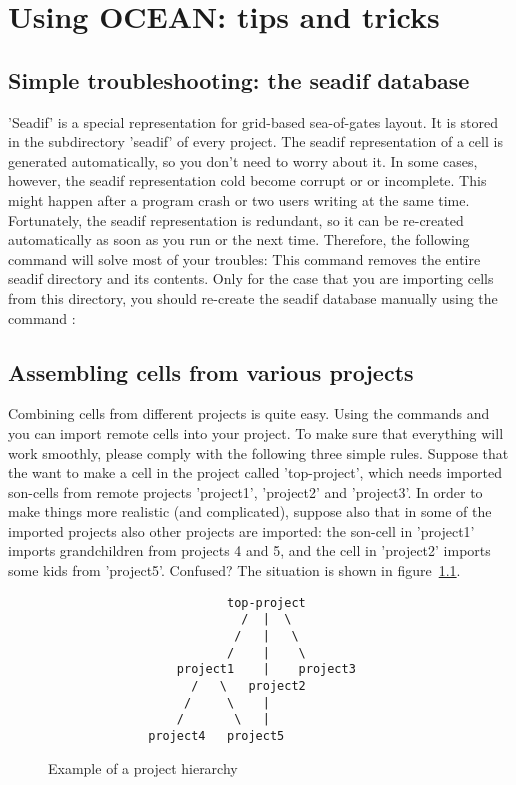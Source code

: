 
\chapter{Using OCEAN: tips and tricks} 

\section{Simple troubleshooting: the seadif database}
'Seadif' is a special representation for grid-based sea-of-gates layout. It is
stored in the subdirectory 'seadif' of every project.  The seadif
representation of a cell is generated automatically, so you don't need to worry
about it. In some cases, however, the seadif representation cold become corrupt
or or incomplete. This might happen after a program crash or two users writing
at the same time. Fortunately, the seadif representation is redundant, so it
can be re-created automatically as soon as you run  or
 the next time. Therefore, the following command will solve most
of your troubles:
This command removes the entire seadif directory and its contents.
Only for the case that you are importing cells from this directory, you should
re-create the seadif database manually using the command :

\section{Assembling cells from various projects}

Combining cells from different projects is quite easy.  Using the commands
 and  you can import remote cells into your
project. To make sure that everything will work smoothly, please comply with
the following three simple rules. Suppose that the want to make a cell in the
project called 'top-project', which needs imported son-cells from remote
projects 'project1', 'project2' and 'project3'.  In order to make things more
realistic (and complicated), suppose also that in some of the imported projects
also other projects are imported: the son-cell in 'project1' imports
grandchildren from projects 4 and 5, and the cell in 'project2' imports some
kids from 'project5'.  Confused?  The situation is shown in
figure~\ref{extree}.

\begin{figure}
\begin{verbatim}
                         top-project
                           /  |  \
                          /   |   \
                         /    |    \
                  project1    |    project3
                    /   \   project2
                   /     \    |
                  /       \   |
              project4   project5
\end{verbatim}
\caption{\label{extree}
Example of a project hierarchy}
\end{figure}

